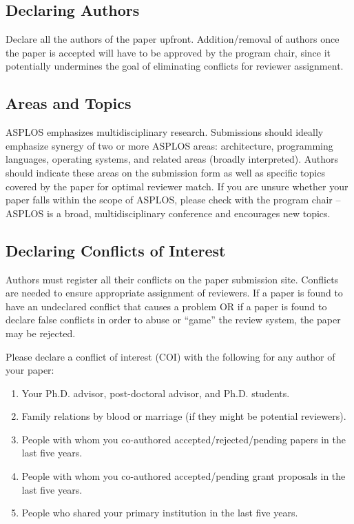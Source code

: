 \documentclass[pageno]{jpaper}
\begin{document}
\subsection{Declaring Authors}

Declare all the authors of the paper upfront. Addition/removal of authors
once the paper is accepted will have to be approved by the program chair,
since it potentially undermines the goal of eliminating conflicts for
reviewer assignment.

\subsection{Areas and Topics}

ASPLOS emphasizes multidisciplinary research. Submissions should ideally
emphasize synergy of two or more ASPLOS areas: architecture, programming
languages, operating systems, and related areas (broadly
interpreted). Authors should indicate these areas on the submission form as
well as specific topics covered by the paper for optimal reviewer match. If
you are unsure whether your paper falls within the scope of ASPLOS, please
check with the program chair -- ASPLOS is a broad, multidisciplinary
conference and encourages new topics.

\subsection{Declaring Conflicts of Interest}

Authors must register all their conflicts on the paper submission site.
Conflicts are needed to ensure appropriate assignment of reviewers.  
If a paper is found to have an undeclared conflict that causes
a problem OR if a paper is found to declare false conflicts in order to
abuse or ``game'' the review system, the paper may be rejected.

Please declare a conflict of interest (COI) with the following 
for any author of your paper:

\begin{enumerate}
\item Your Ph.D. advisor, post-doctoral advisor, and Ph.D. students.
\item Family relations by blood or marriage (if they might be potential reviewers).
\item People with whom you co-authored accepted/rejected/pending papers in the last five years.
\item People with whom you co-authored accepted/pending grant proposals
  in the last five years.
\item People who shared your primary institution in the last five years. 
\end{enumerate}
\end{document}
